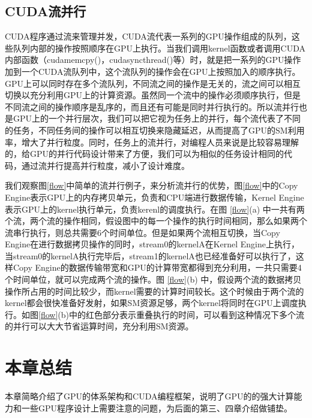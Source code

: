 \subsection{CUDA流并行}
CUDA程序通过流来管理并发，CUDA流代表一系列的GPU操作组成的队列，这些队列内部的操作按照顺序在GPU上执行。当我们调用kernel函数或者调用CUDA内部函数（cudamemcpy()，cudasyncthread()等）时，就是把一系列的GPU操作加到一个CUDA流队列中，这个流队列的操作会在GPU上按照加入的顺序执行。GPU上可以同时存在多个流队列，不同流之间的操作是无关的，流之间可以相互切换以充分利用GPU上的计算资源。虽然同一个流中的操作必须顺序执行，但是不同流之间的操作顺序是乱序的，而且还有可能是同时并行执行的。所以流并行也是GPU上的一个并行层次，我们可以把它视为任务上的并行，每个流代表了不同的任务，不同任务间的操作可以相互切换来隐藏延迟，从而提高了GPU的SM利用率，增大了并行粒度。同时，任务上的流并行，对编程人员来说是比较容易理解的，给GPU的并行代码设计带来了方便，我们可以为相似的任务设计相同的代码，通过流并行提高并行粒度，减小了设计难度。

我们观察图\ref{flow}中简单的流并行例子，来分析流并行的优势，图\ref{flow}中的Copy Engine表示GPU上的内存拷贝单元，负责和CPU端进行数据传输，Kernel Engine表示GPU上的kernel执行单元，负责kerenl的调度执行。在图 \ref{flow}(a) 中一共有两个流，两个流的操作相同，假设图中的每一个操作的执行时间相同，那么如果两个流串行执行，则总共需要6个时间单位。但是如果两个流相互切换，当Copy Engine在进行数据拷贝操作的同时，stream0的kernelA在Kernel Engine上执行，当stream0的kernelA执行完毕后，stream1的kernelA也已经准备好可以执行了，这样Copy Engine的数据传输带宽和GPU的计算带宽都得到充分利用，一共只需要4个时间单位，就可以完成两个流的操作。图 \ref{flow}(b) 中，假设两个流的数据拷贝操作所占用的时间比较少，而kernel需要的计算时间较长。这个时候由于两个流的kernel都会很快准备好发射，如果SM资源足够，两个kernel将同时在GPU上调度执行。如图\ref{flow}(b)中的红色部分表示重叠执行的时间，可以看到这种情况下多个流的并行可以大大节省运算时间，充分利用SM资源。

\section{本章总结}
本章简略介绍了GPU的体系架构和CUDA编程框架，说明了GPU的的强大计算能力和一些GPU程序设计上需要注意的问题，为后面的第三、四章介绍做铺垫。

